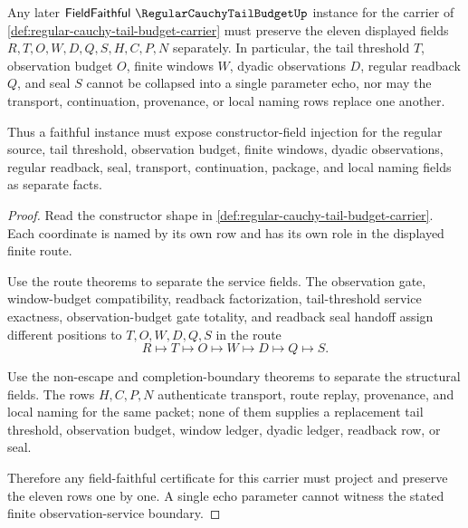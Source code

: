 \begin{theorem}
\label{thm:regular-cauchy-tail-budget-field-faithful-boundary}
Any later $\mathsf{FieldFaithful}\ \RegularCauchyTailBudgetUp$ instance for the carrier of \autoref{def:regular-cauchy-tail-budget-carrier} must preserve the eleven displayed fields $R,T,O,W,D,Q,S,H,C,P,N$ separately. In particular, the tail threshold $T$, observation budget $O$, finite windows $W$, dyadic observations $D$, regular readback $Q$, and seal $S$ cannot be collapsed into a single parameter echo, nor may the transport, continuation, provenance, or local naming rows replace one another.

Thus a faithful instance must expose constructor-field injection for the regular source, tail threshold, observation budget, finite windows, dyadic observations, regular readback, seal, transport, continuation, package, and local naming fields as separate facts.
\end{theorem}
\begin{proof}
Read the constructor shape in \autoref{def:regular-cauchy-tail-budget-carrier}. Each coordinate is named by its own row and has its own role in the displayed finite route.

Use the route theorems to separate the service fields. The observation gate, window-budget compatibility, readback factorization, tail-threshold service exactness, observation-budget gate totality, and readback seal handoff assign different positions to $T,O,W,D,Q,S$ in the route
$$
R \longmapsto T \longmapsto O \longmapsto W \longmapsto D \longmapsto Q \longmapsto S.
$$

Use the non-escape and completion-boundary theorems to separate the structural fields. The rows $H,C,P,N$ authenticate transport, route replay, provenance, and local naming for the same packet; none of them supplies a replacement tail threshold, observation budget, window ledger, dyadic ledger, readback row, or seal.

Therefore any field-faithful certificate for this carrier must project and preserve the eleven rows one by one. A single echo parameter cannot witness the stated finite observation-service boundary.
\end{proof}


